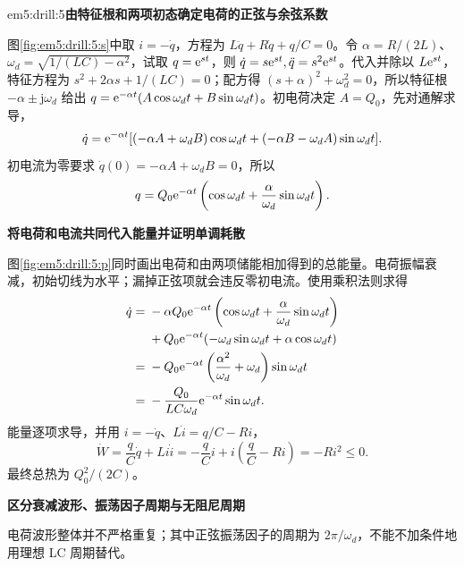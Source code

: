 \begin{drillsolution}{em5:drill:5}\textbf{由特征根和两项初态确定电荷的正弦与余弦系数}\par\nobreak
图\ref{fig:em5:drill:5:s}中取 $i=-\dot q$，方程为 $L\ddot q+R\dot q+q/C=0$。令 $\alpha=R/(2L)$、$\omega_d=\sqrt{1/(LC)-\alpha^2}$，试取 $q=\mathrm e^{st}$，则 $\dot q=s\mathrm e^{st},\ddot q=s^2\mathrm e^{st}$。代入并除以 $L\mathrm e^{st}$，特征方程为 $s^2+2\alpha s+1/(LC)=0$；配方得 $(s+\alpha)^2+\omega_d^2=0$，所以特征根 $-\alpha\pm\mathrm j\omega_d$ 给出 $q=\mathrm e^{-\alpha t}(A\cos\omega_dt+B\sin\omega_dt)$。初电荷决定 $A=Q_0$，先对通解求导，
\[
 \dot q=\mathrm e^{-\alpha t}
 [(-\alpha A+\omega_dB)\cos\omega_dt
  +(-\alpha B-\omega_dA)\sin\omega_dt].
\]
初电流为零要求 $\dot q(0)=-\alpha A+\omega_dB=0$，所以
\[q=Q_0\mathrm e^{-\alpha t}\left(\cos\omega_dt+\frac\alpha{\omega_d}\sin\omega_dt\right).\]



\par\medskip{}\noindent\textbf{将电荷和电流共同代入能量并证明单调耗散}\par\nobreak
图\ref{fig:em5:drill:5:p}同时画出电荷和由两项储能相加得到的总能量。电荷振幅衰减，初始切线为水平；漏掉正弦项就会违反零初电流。使用乘积法则求得
\begin{align*}
\dot q={}&-\alpha Q_0\mathrm e^{-\alpha t}
\left(\cos\omega_dt+\frac\alpha{\omega_d}\sin\omega_dt\right)\\
&+Q_0\mathrm e^{-\alpha t}
(-\omega_d\sin\omega_dt+\alpha\cos\omega_dt)\\
={}&-Q_0\mathrm e^{-\alpha t}
\left(\frac{\alpha^2}{\omega_d}+\omega_d\right)\sin\omega_dt\\
={}&-\frac{Q_0}{LC\omega_d}\mathrm e^{-\alpha t}\sin\omega_dt.
\end{align*}
能量逐项求导，并用 $i=-\dot q$、$L\dot i=q/C-Ri$，
\[
\dot W=\frac qC\dot q+Li\dot i
=-\frac qCi+i\left(\frac qC-Ri\right)=-Ri^2\le0.
\]最终总热为 $Q_0^2/(2C)$。

\par\medskip{}\noindent\textbf{区分衰减波形、振荡因子周期与无阻尼周期}\par\nobreak
电荷波形整体并不严格重复；其中正弦振荡因子的周期为 $2\pi/\omega_d$，不能不加条件地用理想 LC 周期替代。\end{drillsolution}
